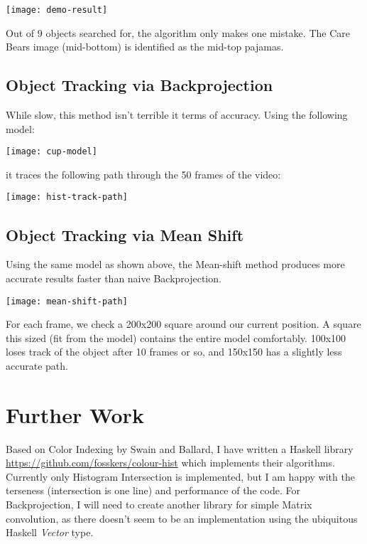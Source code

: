 \documentclass{article}
\begin{document}
\begin{center}
  \texttt{[image: demo-result]}
\end{center}

Out of 9 objects searched for, the algorithm only makes one mistake.
The Care Bears image (mid-bottom) is identified as the mid-top pajamas.

\subsection{Object Tracking via Backprojection}
While slow, this method isn't terrible it terms of accuracy.
Using the following model:

\begin{center}
  \texttt{[image: cup-model]}
\end{center}

it traces the following path through the 50 frames of the video:

\begin{center}
  \texttt{[image: hist-track-path]}
\end{center}

\subsection{Object Tracking via Mean Shift}
Using the same model as shown above, the Mean-shift method produces
more accurate results faster than naive Backprojection.

\begin{center}
  \texttt{[image: mean-shift-path]}
\end{center}

For each frame, we check a 200x200 square around our current position.
A square this sized (fit from the model) contains the entire model
comfortably. 100x100 loses track of the object after 10 frames or so,
and 150x150 has a slightly less accurate path.

\section{Further Work}
Based on Color Indexing by Swain and Ballard, I have written a Haskell
library \url{https://github.com/fosskers/colour-hist} which implements their
algorithms. Currently only Histogram Intersection is implemented, but I am
happy with the terseness (intersection is one line) and performance of the
code. For Backprojection, I will need to create another library for simple
Matrix convolution, as there doesn't seem to be an implementation using the
ubiquitous Haskell
\emph{Vector} type.
\end{document}
